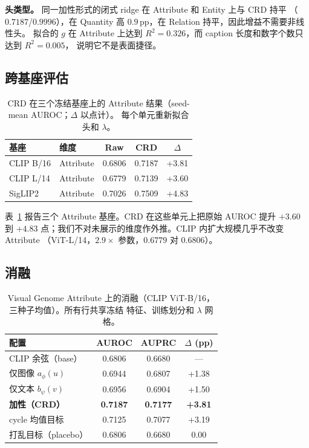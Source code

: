 \documentclass[10pt,twocolumn,a4paper]{ctexart}
\begin{document}
\textbf{头类型。} 同一加性形式的闭式 ridge 在 Attribute 和 Entity 上与 CRD 持平
（$0.7187$/$0.9996$），在 Quantity 高 $0.9$\,pp，在 Relation 持平，因此增益不需要非线性头。
拟合的 $g$ 在 Attribute 上达到 $R^2=0.326$，而 caption 长度和数字个数只达到 $R^2=0.005$，
说明它不是表面捷径。

\subsection{跨基座评估}
\label{sec:cross-cn}
\begin{table}[t]
\centering
\small
\setlength{\tabcolsep}{3.5pt}
\caption{CRD 在三个冻结基座上的 Attribute 结果（seed-mean AUROC；$\Delta$ 以点计）。
每个单元重新拟合头和 $\lambda$。}
\label{tab:cross-cn}
\begin{tabular}{llccc}
\toprule
基座 & 维度 & Raw & CRD & $\Delta$ \\
\midrule
CLIP B/16  & Attribute & 0.6806 & 0.7187 & +3.81 \\
CLIP L/14  & Attribute & 0.6779 & 0.7139 & +3.60 \\
SigLIP2    & Attribute & 0.7026 & 0.7509 & +4.83 \\
\bottomrule
\end{tabular}
\end{table}

表~\ref{tab:cross-cn} 报告三个 Attribute 基座。CRD 在这些单元上把原始 AUROC 提升
$+3.60$ 到 $+4.83$ 点；我们不对未展示的维度作外推。CLIP 内扩大规模几乎不改变 Attribute
（ViT-L/14，$2.9\times$ 参数，$0.6779$ 对 $0.6806$）。

\subsection{消融}
\begin{table}[t]
\centering
\small
\setlength{\tabcolsep}{5pt}
\caption{Visual Genome Attribute 上的消融（CLIP ViT-B/16，三种子均值）。所有行共享冻结
特征、训练划分和 $\lambda$ 网格。}
\label{tab:ablation-cn}
\begin{tabular}{lccc}
\toprule
配置 & AUROC & AUPRC & $\Delta$ (pp) \\
\midrule
CLIP 余弦（base）       & 0.6806 & 0.6680 & ---    \\
仅图像 $a_\phi(u)$      & 0.6944 & 0.6807 & +1.38  \\
仅文本 $b_\psi(v)$      & 0.6956 & 0.6904 & +1.50  \\
\textbf{加性（CRD）}     & \textbf{0.7187} & \textbf{0.7177} & \textbf{+3.81} \\
cycle 均值目标           & 0.7125 & 0.7077 & +3.19  \\
打乱目标（placebo）      & 0.6806 & 0.6680 & 0.00   \\
\bottomrule
\end{tabular}
\end{table}
\end{document}
